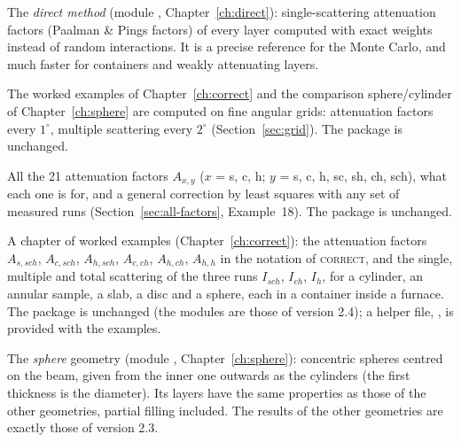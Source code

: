 \begin{note}
The \emph{direct method} (module , Chapter~\ref{ch:direct}): single-scattering attenuation factors
(Paalman \& Pings factors) of every layer computed with exact weights instead of random interactions. It is a precise reference for the
Monte Carlo, and much faster for containers and weakly attenuating layers.
\end{note}

\begin{note}
The worked examples of Chapter~\ref{ch:correct} and the comparison sphere/cylinder of Chapter~\ref{ch:sphere} are computed on fine
angular grids: attenuation factors every $1^\circ$, multiple scattering every $2^\circ$ (Section~\ref{sec:grid}). The package is unchanged.
\end{note}

\begin{note}
All the 21 attenuation factors $A_{x,y}$ ($x$ = s, c, h; $y$ = s, c, h, sc, sh, ch, sch), what each one is for, and a general correction
by least squares with any set of measured runs (Section~\ref{sec:all-factors}, Example~18). The package is unchanged.
\end{note}

\begin{note}
A chapter of worked examples (Chapter~\ref{ch:correct}): the attenuation factors $A_{s,sch}$, $A_{c,sch}$, $A_{h,sch}$, $A_{c,ch}$,
$A_{h,ch}$, $A_{h,h}$ in the notation of \textsc{correct}, and the single, multiple and total scattering of the three runs $I_{sch}$,
$I_{ch}$, $I_h$, for a cylinder, an annular sample, a slab, a disc and a sphere, each in a container inside a furnace. The package is
unchanged (the modules are those of version 2.4); a helper file, , is provided with the examples.
\end{note}

\begin{note}
The \emph{sphere} geometry (module , Chapter~\ref{ch:sphere}): concentric spheres centred on the beam, given from the
inner one outwards as the cylinders (the first thickness is the diameter). Its layers have the same properties as those of the other
geometries, partial filling included. The results of the other geometries are exactly those of version 2.3.
\end{note}

